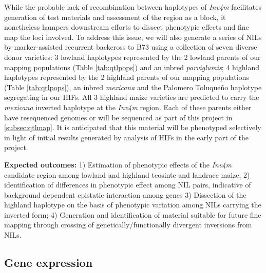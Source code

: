 While the probable lack of recombination between haplotypes of \emph{Inv4m} \citep{Pyhajarvi2013} facilitates generation of test materials and assessment of the region as a block, it nonetheless hampers downstream efforts to dissect phenotypic effects and fine map the loci involved. To address this issue, we will also generate a series of NILs by marker-assisted recurrent backcross to B73 using a collection of seven diverse donor varieties: 3 lowland haplotypes represented by the 2 lowland parents of our mapping populations (Table \ref{tab:qtlpops}) and an inbred \emph{parviglumis}; 4 highland haplotypes represented by the 2 highland parents of our mapping populations (Table \ref{tab:qtlpops}), an inbred \emph{mexicana} and the Palomero Toluque\~no haplotype segregating in our HIFs. All 3 highland maize varieties are predicted to carry the \emph{mexicana} inverted haplotype at the \emph{Inv4m} region.  Each of these parents either have resequenced genomes \citep{Vielle-Calzada2009, Chia2012a} or will be sequenced as part of this project in \ref{subsec:qtlmap}. It is anticipated that this material will be phenotyped selectively in light of initial results generated by analysis of HIFs in the early part of the project.

{\bf Expected outcomes:} 1) Estimation of phenotypic effects of the \emph{Inv4m} candidate region among lowland and highland teosinte and landrace maize; 2) identification of differences in phenotypic effect among NIL pairs, indicative of background dependent epistatic interaction among genes 3) Dissection of the highland haplotype on the basis of phenotypic variation among NILs carrying the inverted form; 4) Generation and identification of material suitable for future fine mapping through crossing of genetically/functionally divergent inversions from NILs.   

\subsection{Gene expression} \label{subsec:rnaseq}

